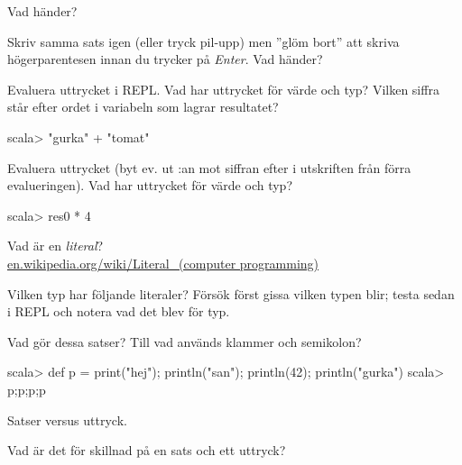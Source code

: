 \Subtask Vad händer? 

\Subtask Skriv samma sats igen (eller tryck pil-upp) men ''glöm bort'' att skriva högerparentesen innan du trycker på \textit{Enter}. Vad händer?

\Subtask Evaluera uttrycket  i REPL. Vad har uttrycket för värde och typ? Vilken siffra står efter ordet  i variabeln som lagrar resultatet?

\begin{REPLnonum}
scala> "gurka" + "tomat"   
\end{REPLnonum}

\Subtask Evaluera uttrycket  (byt ev. ut :an mot siffran efter  i utskriften från förra evalueringen). Vad har uttrycket för värde och typ?
\begin{REPLnonum}
scala> res0 * 4
\end{REPLnonum}


\Task\Pen Vad är en \textit{literal}? \\ \href{https://en.wikipedia.org/wiki/Literal\_\%28computer_programming\%29}{en.wikipedia.org/wiki/Literal\_(computer programming)}%

\Task Vilken typ har följande literaler? Försök först gissa vilken typen blir; testa sedan i REPL och notera vad det blev för typ. %

\Subtask {} 

\Subtask {}

\Subtask {}

\Subtask {}

\Subtask {}

\Subtask {}

\Subtask {}

\Subtask {}

\Subtask {}

\Subtask {}

\Subtask {}


\Task\Pen Vad gör dessa satser? Till vad används klammer och semikolon? %
\begin{REPLnonum}
scala> def p = { print("hej"); println("san"); println(42); println("gurka") }
scala> p;p;p;p
\end{REPLnonum}

\Task\Pen Satser versus uttryck. %

\Subtask Vad är det för skillnad på en sats och ett uttryck?


